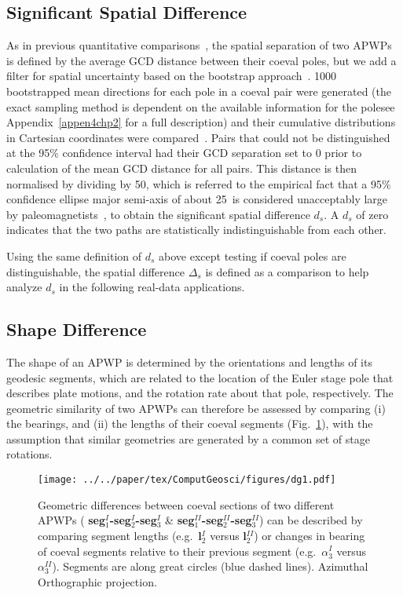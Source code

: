 \subsection{Significant Spatial Difference}\label{sec:sigDs}

As in previous quantitative comparisons~\citep[for example]{S07,T08}, the
spatial separation of two APWPs is defined by the average GCD distance between
their coeval poles, but we add a filter for spatial uncertainty based on the
bootstrap approach~\citep{T91}. 1000 bootstrapped mean directions for each pole
in a coeval pair were generated (the exact sampling method is dependent on the
available information for the pole\textemdash{}see Appendix~\ref{appen4chp2} for
a full description) and their cumulative distributions in Cartesian coordinates
were compared~\citep{T91}. Pairs that could not be distinguished at the 95\%
confidence interval had their GCD separation set to 0 prior to calculation of
the mean GCD distance for all pairs. This distance is then normalised by
dividing by 50\degree, which is referred to the empirical fact that a 95\%
confidence ellipse major semi-axis of about 25\degree\ is considered
unacceptably large by paleomagnetists~\citep{B92}, to obtain the significant
spatial difference $d_s$. A $d_s$ of zero indicates that the two paths are
statistically indistinguishable from each other.

Using the same definition of $d_s$ above except testing if coeval poles are
distinguishable, the spatial difference $\Delta_s$ is defined as a comparison to
help analyze $d_s$ in the following real-data applications.

\subsection{Shape Difference}

The shape of an APWP is determined by the orientations and lengths of its
geodesic segments, which are related to the location of the Euler stage pole
that describes plate motions, and the rotation rate about that pole,
respectively. The geometric similarity of two APWPs can therefore be assessed
by comparing (i) the bearings, and (ii) the lengths of their coeval segments
(Fig.~\ref{fig:direcdiff}), with the assumption that similar geometries are
generated by a common set of stage rotations.

\begin{figure}[!ht]
\texttt{[image: ../../paper/tex/ComputGeosci/figures/dg1.pdf]}
\caption[Geometric difference definition between two APWPs]{Geometric
differences between coeval sections of two different APWPs ({\bf
seg$_1^I$-seg$_2^I$-seg$_3^I$} \& {\bf seg$_1^{II}$-seg$_2^{II}$-seg$_3^{II}$})
can be described by comparing segment lengths (e.g.\ {\bf l$_2^I$} versus {\bf
l$_2^{II}$}) or changes in bearing of coeval segments relative to their
previous segment (e.g.\ {\bf $\alpha_3^I$} versus {\bf $\alpha_3^{II}$}). Segments
are along great circles (blue dashed lines). Azimuthal Orthographic
projection.}\label{fig:direcdiff}
\end{figure}

